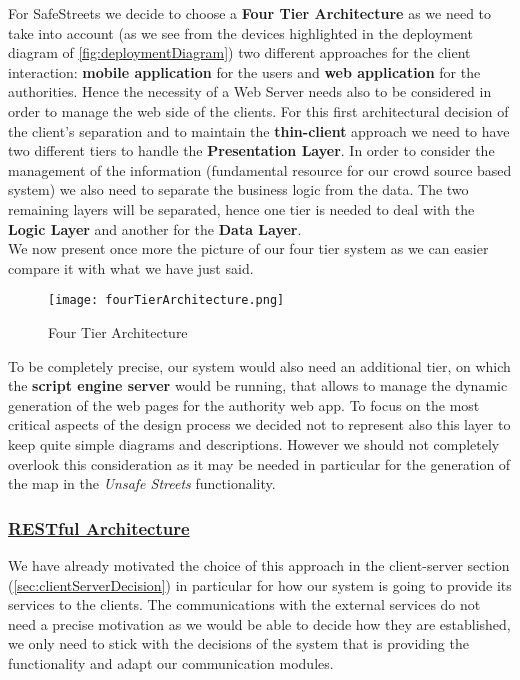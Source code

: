 			For SafeStreets we decide to choose a \textbf{Four Tier Architecture} as we need to take into account (as we see from the devices highlighted in the deployment diagram of \autoref{fig:deploymentDiagram}) two different approaches for the client interaction: \textbf{mobile application} for the users and \textbf{web application} for the authorities. Hence the necessity of a Web Server needs also to be considered in order to manage the web side of the clients. For this first architectural decision of the client's separation and to maintain the \textbf{thin-client} approach we need to have two different tiers to handle the \textbf{Presentation Layer}. In order to consider the management of the information (fundamental resource for our crowd source based system) we also need to separate the business logic from the data. The two remaining layers will be separated, hence one tier is needed to deal with the \textbf{Logic Layer} and another for the \textbf{Data Layer}.\\
			
			We now present once more the picture of our four tier system as we can easier compare it with what we have just said.
			
			\begin{figure}[h!]
				\centering
				\texttt{[image: fourTierArchitecture.png]}
				\caption{Four Tier Architecture}
			\end{figure}
		
			To be completely precise, our system would also need an additional tier, on which the \textbf{script engine server} would be running, that allows to manage the dynamic generation of  the web pages for the authority web app. To focus on the most critical aspects of the design process we decided not to represent also this layer to keep quite simple diagrams and descriptions. However we should not completely overlook this consideration as it may be needed in particular for the generation of the map in the \emph{Unsafe Streets} functionality.
			
		\subsubsection[RESTful Architecture]{\hyperlink{toc}{RESTful Architecture}}
			\label{sec:RESTDecision}
			
			We have already motivated the choice of this approach in the client-server section (\ref{sec:clientServerDecision}) in particular for how our system is going to provide its services to the clients. The communications with the external services do not need a precise motivation as we would be able to decide how they are established, we only need to stick with the decisions of the system that is providing the functionality and adapt our communication modules.\\
			
